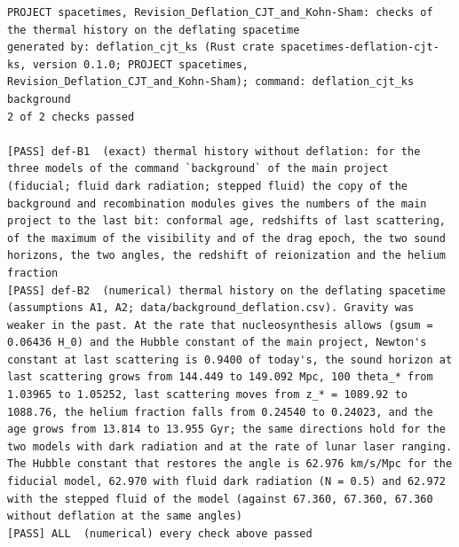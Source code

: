 \documentclass[
  10pt,
]{article}
\begin{document}
\begin{verbatim}
PROJECT spacetimes, Revision_Deflation_CJT_and_Kohn-Sham: checks of the thermal history on the deflating spacetime
generated by: deflation_cjt_ks (Rust crate spacetimes-deflation-cjt-ks, version 0.1.0; PROJECT spacetimes, Revision_Deflation_CJT_and_Kohn-Sham); command: deflation_cjt_ks background
2 of 2 checks passed

[PASS] def-B1  (exact) thermal history without deflation: for the three models of the command `background` of the main project (fiducial; fluid dark radiation; stepped fluid) the copy of the background and recombination modules gives the numbers of the main project to the last bit: conformal age, redshifts of last scattering, of the maximum of the visibility and of the drag epoch, the two sound horizons, the two angles, the redshift of reionization and the helium fraction
[PASS] def-B2  (numerical) thermal history on the deflating spacetime (assumptions A1, A2; data/background_deflation.csv). Gravity was weaker in the past. At the rate that nucleosynthesis allows (gsum = 0.06436 H_0) and the Hubble constant of the main project, Newton's constant at last scattering is 0.9400 of today's, the sound horizon at last scattering grows from 144.449 to 149.092 Mpc, 100 theta_* from 1.03965 to 1.05252, last scattering moves from z_* = 1089.92 to 1088.76, the helium fraction falls from 0.24540 to 0.24023, and the age grows from 13.814 to 13.955 Gyr; the same directions hold for the two models with dark radiation and at the rate of lunar laser ranging. The Hubble constant that restores the angle is 62.976 km/s/Mpc for the fiducial model, 62.970 with fluid dark radiation (N = 0.5) and 62.972 with the stepped fluid of the model (against 67.360, 67.360, 67.360 without deflation at the same angles)
[PASS] ALL  (numerical) every check above passed
\end{verbatim}
\end{document}

